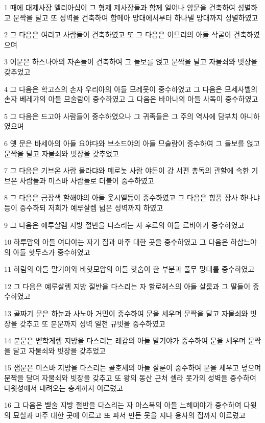 \par 1 때에 대제사장 엘리아십이 그 형제 제사장들과 함께 일어나 양문을 건축하여 성별하고 문짝을 달고 또 성벽을 건축하여 함메아 망대에서부터 하나넬 망대까지 성별하였고
\par 2 그 다음은 여리고 사람들이 건축하였고 또 그 다음은 이므리의 아들 삭굴이 건축하였으며
\par 3 어문은 하스나아의 자손들이 건축하여 그 들보를 얹고 문짝을 달고 자물쇠와 빗장을 갖추었고
\par 4 그 다음은 학고스의 손자 우리아의 아들 므레못이 중수하였고 그 다음은 므세사벨의 손자 베레갸의 아들 므술람이 중수하였고 그 다음은 바아나의 아들 사독이 중수하였고
\par 5 그 다음은 드고아 사람들이 중수하였으나 그 귀족들은 그 주의 역사에 담부치 아니하였으며
\par 6 옛 문은 바세아의 아들 요야다와 브소드야의 아들 므술람이 중수하여 그 들보를 얹고 문짝을 달고 자물쇠와 빗장을 갖추었고
\par 7 그 다음은 기브온 사람 믈라댜와 메로놋 사람 야돈이 강 서편 총독의 관할에 속한 기브온 사람들과 미스바 사람들로 더불어 중수하였고
\par 8 그 다음은 금장색 할해야의 아들 웃시엘등이 중수하였고 그 다음은 향품 장사 하나냐등이 중수하되 저희가 예루살렘 넓은 성벽까지 하였고
\par 9 그 다음은 예루살렘 지방 절반을 다스리는 자 후르의 아들 르바야가 중수하였고
\par 10 하루맙의 아들 여다야는 자기 집과 마주 대한 곳을 중수하였고 그 다음은 하삽느야의 아들 핫두스가 중수하였고
\par 11 하림의 아들 말기야와 바핫모압의 아들 핫숩이 한 부분과 풀무 망대를 중수하였고
\par 12 그 다음은 예루살렘 지방 절반을 다스리는 자 할로헤스의 아들 살룸과 그 딸들이 중수하였고
\par 13 골짜기 문은 하눈과 사노아 거민이 중수하여 문을 세우며 문짝을 달고 자물쇠와 빗장을 갖추고 또 분문까지 성벽 일천 규빗을 중수하였고
\par 14 분문은 벧학게렘 지방을 다스리는 레갑의 아들 말기야가 중수하여 문을 세우며 문짝을 달고 자물쇠와 빗장을 갖추었고
\par 15 샘문은 미스바 지방을 다스리는 골호세의 아들 살룬이 중수하여 문을 세우고 덮으며 문짝을 달며 자물쇠와 빗장을 갖추고 또 왕의 동산 근처 셀라 못가의 성벽을 중수하여 다윗성에서 내려오는 층계까지 이르렀고
\par 16 그 다음은 벧술 지방 절반을 다스리는 자 아스북의 아들 느헤미야가 중수하여 다윗의 묘실과 마주 대한 곳에 이르고 또 파서 만든 못을 지나 용사의 집까지 이르렀고
